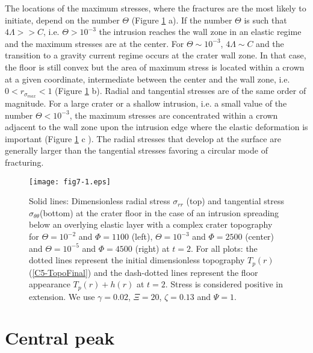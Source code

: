 The locations  of the  maximum stresses, where  the fractures  are the
most  likely  to  initiate,  depend on  the  number  $\Theta$  (Figure
\ref{C5-fig7-1} a). If the number $\Theta$ is such that $4\Lambda>>C$,
i.e.   $\Theta>10^{-3}$ the  intrusion  reaches the  wall  zone in  an
elastic  regime and  the  maximum  stresses are  at  the center.   For
$\Theta\sim10^{-3}$, $4\Lambda \sim C$ and the transition to a gravity
current regime occurs at the crater wall zone. In that case, the floor
is still  convex but the  area of maximum  stress is located  within a
crown at a  given coordinate, intermediate between the  center and the
wall  zone, i.e.   $0<r_{\sigma_{max}}<1$ (Figure  \ref{C5-fig7-1} b).
Radial and tangential stresses are of the same order of magnitude. For
a large  crater or  a shallow  intrusion, i.e.  a  small value  of the
number $\Theta<10^{-3}$, the maximum  stresses are concentrated within
a crown  adjacent to the wall  zone upon the intrusion  edge where the
elastic  deformation is  important (Figure  \ref{C5-fig7-1} c  ).  The
radial stresses that develop at  the surface are generally larger than
the tangential stresses favoring a circular mode of fracturing.


\begin{figure}[h!]
  \begin{center}
    \graphicspath{{/Users/thorey/Documents/These/Submission/Article/FFC_JGR_2013/Paper_APRES_2nd_REVIEW/}}
    \texttt{[image: fig7-1.eps]}
    \caption{Solid  lines: Dimensionless  radial stress  $\sigma_{rr}$
      (top) and tangential  stress $\sigma_{\theta \theta}$(bottom) at
      the crater floor in the case  of an intrusion spreading below an
      overlying  elastic layer  with a  complex crater  topography for
      $\Theta=10^{-2}$  and $\Phi=1100$  (left), $\Theta=10^{-3}$  and
      $\Phi=2500$  (center)   and  $\Theta=10^{-5}$   and  $\Phi=4500$
      (right) at $t=2$. For all  plots: the dotted lines represent the
      initial  dimensionless topography  $T_p(r)$ (\ref{C5-TopoFinal})
      and  the  dash-dotted  lines   represent  the  floor  appearance
      $T_p(r)+h(r)$  at  $t=2$.   Stress  is  considered  positive  in
      extension.   We use  $\gamma=0.02$,  $\Xi=20$, $\zeta=0.13$  and
      $\Psi=1$.}
    \label{C5-fig7-1}
  \end{center}
\end{figure}

\section{Central peak}
\label{C5-AppendixC}

